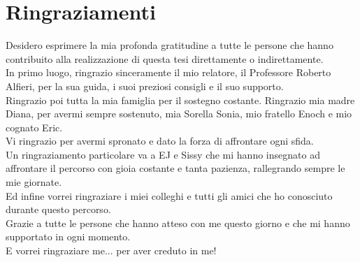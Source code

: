 \chapter*{Ringraziamenti}

Desidero esprimere la mia profonda gratitudine a tutte le persone che hanno contribuito alla realizzazione di questa tesi direttamente o indirettamente.\\

In primo luogo, ringrazio sinceramente il mio relatore, il Professore Roberto Alfieri, per la sua guida, i suoi preziosi consigli e il suo supporto.\\
Ringrazio poi tutta la mia famiglia per il sostegno costante.
Ringrazio mia madre Diana, per avermi sempre sostenuto, mia Sorella Sonia, mio fratello Enoch e mio cognato Eric.\\ Vi ringrazio per avermi spronato e dato la forza di affrontare ogni sfida.\\

Un ringraziamento particolare va a EJ e Sissy che mi hanno insegnato ad affrontare il percorso con gioia costante e tanta pazienza, rallegrando sempre le mie giornate.\\

Ed infine vorrei ringraziare i miei colleghi e tutti gli amici che ho conosciuto durante questo percorso. \\
Grazie a tutte le persone che hanno atteso con me questo giorno e che mi hanno supportato in ogni momento.\\

E vorrei ringraziare me... per aver creduto in me!